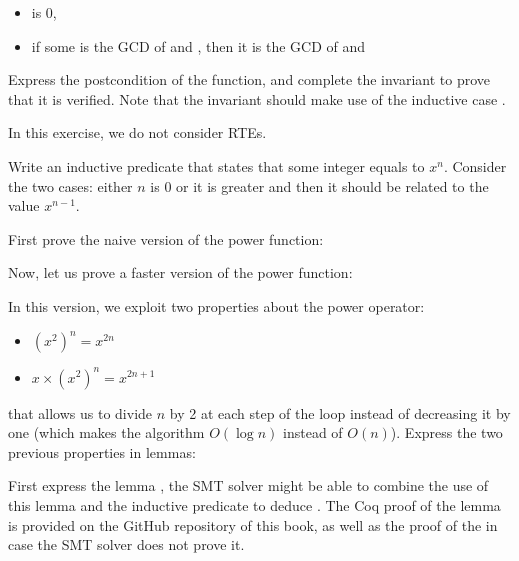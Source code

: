 \begin{itemize}
\item {} is 0,
\item if some  is the GCD of  and ,
  then it is the GCD of  and 
\end{itemize}




Express the postcondition of the function, and complete the invariant to prove
that it is verified. Note that the invariant should make use of the inductive
case .





In this exercise, we do not consider RTEs.


Write an inductive predicate that states that some integer  equals
to $x^n$. Consider the two cases: either $n$ is 0 or it is greater and then it
should be related to the value $x^{n-1}$.




First prove the naive version of the power function:




Now, let us prove a faster version of the power function:




In this version, we exploit two properties about the power operator:


\begin{itemize}
\item $(x^2)^n = x^{2n}$
\item $x \times (x^2)^n = x^{2n+1}$
\end{itemize}


that allows us to divide $n$ by 2 at each step of the loop instead of decreasing
it by one (which makes the algorithm $O(\log n)$ instead of $O(n)$). Express the
two previous properties in lemmas:




First express the lemma , the SMT solver might be able
to combine the use of this lemma and the inductive predicate to deduce
. The Coq proof of the  lemma is
provided on the GitHub repository of this book, as well as the proof of the
 in case the SMT solver does not prove it.



